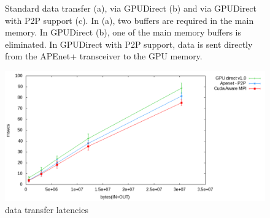 \documentclass[letterpaper]{jpconf}
\begin{document}
\begin{figure}[!t]
\centering
{}
\hspace{1mm}
\caption{Standard data transfer (a), via GPUDirect (b) and via
  GPUDirect with P2P support (c). In (a), two buffers are required in
  the main memory. In GPUDirect (b), one of the main memory buffers is
  eliminated. In GPUDirect with P2P support, data is sent directly
  from the APEnet+ transceiver to the GPU memory.}
\end{figure}

\begin{figure}[tbp]
  \centering
  \includegraphics[width=0.7\linewidth]{figures/datatransfer.pdf}
  \caption{data transfer latencies}
  \label{fig:xferlatency}
\end{figure}
\end{document}
